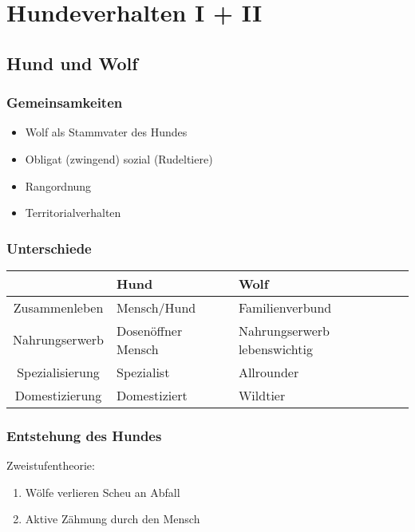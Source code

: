 \chapter{Hundeverhalten I + II}


\section{Hund und Wolf}

    \subsection{Gemeinsamkeiten}
    \begin{itemize}
        \item Wolf als Stammvater des Hundes
        \item Obligat (zwingend) sozial (Rudeltiere)
        \item Rangordnung
        \item Territorialverhalten
    \end{itemize}

    \subsection{Unterschiede}
    \begin{center}
        \begin{tabular}{c|l|l}
            & \textbf{Hund} & \textbf{Wolf} \\
            \hline
            Zusammenleben   & Mensch/Hund & Familienverbund \\
            Nahrungserwerb  & Dosenöffner Mensch & Nahrungserwerb lebenswichtig \\
            Spezialisierung & Spezialist & Allrounder \\
            Domestizierung  & Domestiziert & Wildtier
        \end{tabular}
    \end{center}

    \subsection{Entstehung des Hundes}
    Zweistufentheorie:
    \begin{enumerate}
        \item Wölfe verlieren Scheu an Abfall
        \item Aktive Zähmung durch den Mensch
    \end{enumerate}


